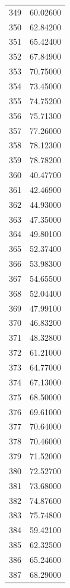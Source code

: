 \documentclass[
  letterpaper,
  DIV=11,
  numbers=noendperiod]{scrreprt}
\begin{document}
\begin{tcolorbox}
\begin{tabular}{lr}
349  &         60.02600 \\
350  &         62.84200 \\
351  &         65.42400 \\
352  &         67.84900 \\
353  &         70.75000 \\
354  &         73.45000 \\
355  &         74.75200 \\
356  &         75.71300 \\
357  &         77.26000 \\
358  &         78.12300 \\
359  &         78.78200 \\
360  &         40.47700 \\
361  &         42.46900 \\
362  &         44.93000 \\
363  &         47.35000 \\
364  &         49.80100 \\
365  &         52.37400 \\
366  &         53.98300 \\
367  &         54.65500 \\
368  &         52.04400 \\
369  &         47.99100 \\
370  &         46.83200 \\
371  &         48.32800 \\
372  &         61.21000 \\
373  &         64.77000 \\
374  &         67.13000 \\
375  &         68.50000 \\
376  &         69.61000 \\
377  &         70.64000 \\
378  &         70.46000 \\
379  &         71.52000 \\
380  &         72.52700 \\
381  &         73.68000 \\
382  &         74.87600 \\
383  &         75.74800 \\
384  &         59.42100 \\
385  &         62.32500 \\
386  &         65.24600 \\
387  &         68.29000 \\

\end{tabular}
\end{tcolorbox}
\end{document}
